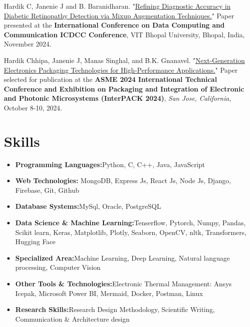 \documentclass[a4paper,11pt]{article}
\newcommand{\resumeItem}[2]{
  \item{
    \textbf{#1}{\hspace{0.5mm}#2 \vspace{-0.5mm}}
  }
}
\newcommand{\resumeSubItem}[2]{\resumeItem{#1}{#2}\vspace{-4pt}}
\newcommand{\resumeHeadingSkillStart}{\begin{itemize}[leftmargin=*,itemsep=1.7mm, rightmargin=2ex]}
\newcommand{\resumeHeadingSkillEnd}{\end{itemize}\vspace{-2mm}}
\begin{document}
\item[\textbf{[C.2]}] Hardik C, Janenie J and B. Baranidharan. "\href{}{Refining Diagnostic Accuracy in Diabetic Retinopathy Detection via Mixup Augmentation Techniques.}" Paper presented at the \textbf{ International Conference on Data Computing and Communication ICDCC Conference}, VIT Bhopal University, Bhopal, India, November 2024.

\item[\textbf{[A.1]}] Hardik Chhipa, Janenie J, Manas Singhal, and B.K. Gnanavel. "\href{https://drive.google.com/file/d/1E_Zn4wZcBVu7EPU99xruYk3HZXN7khpM/view?usp=sharing}{Next-Generation Electronics Packaging Technologies for High-Performance Applications.}" Paper selected for publication at the \textbf{ASME 2024 International Technical Conference and Exhibition on Packaging and Integration of Electronic and Photonic Microsystems (InterPACK 2024)}, \textit{San Jose, California,} October 8-10, 2024. 


\section*{\hspace{-3em}\textbf{Skills}} 
\vspace{-0.4mm}
 \resumeHeadingSkillStart
  \resumeSubItem{Programming Languages:}
    {Python, C, C++, Java, JavaScript}
  \resumeSubItem{Web Technologies:}
    { MongoDB, Express Js, React Js, Node Js, Django, Firebase, Git, Github}
  \resumeSubItem{Database Systems:}
    {MySql, Oracle, PostgreSQL}
  \resumeSubItem{Data Science \& Machine Learning:}
    {Tenserflow, Pytorch, Numpy, Pandas, Scikit learn, Keras, Matplotlib, Plotly, Seaborn, OpenCV, nltk, Transformers, Hugging Face}
  \resumeSubItem{Specialized Area:}
    {Machine Learning, Deep Learning, Natural language processing, Computer Vision}
  \resumeSubItem{Other Tools \& Technologies:}
    {Electronic Thermal Management: Ansys Icepak, Microsoft Power BI, Mermaid, Docker, Postman, Linux}
  \resumeSubItem{Research Skills:}{Research Design Methodology, Scientific Writing, Communication \& Architecture design}
 \resumeHeadingSkillEnd
\end{document}
